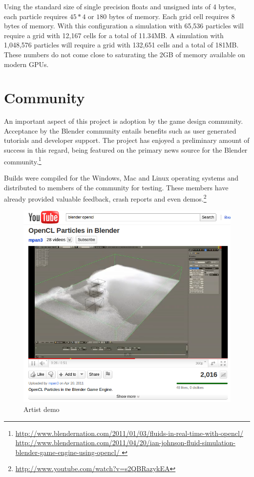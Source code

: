 Using the standard size of single precision floats and unsigned ints of 4
bytes, each particle requires $45*4$ or $180$ bytes of memory. Each grid cell
requires $8$ bytes of memory. With this configuration a simulation with 65,536
particles will require a grid with 12,167 cells for a total of 11.34MB. A
simulation with 1,048,576 particles will require a grid with 132,651 cells and a
total of 181MB. These numbers do not come close to saturating the 2GB of memory
available on modern GPUs.


\section{Community}
An important aspect of this project is adoption by the game design community.
Acceptance by the Blender community entails benefits such as user generated
tutorials and developer support. The project has enjoyed a preliminary amount
of success in this regard, being featured on the primary news source for
the Blender community.\footnote{
\url{http://www.blendernation.com/2011/01/03/fluids-in-real-time-with-opencl/}
\\ 
\url{
http://www.blendernation.com/2011/04/20/ian-johnson-fluid-simulation-blender-game-engine-using-opencl/
} }

Builds were compiled for the Windows, Mac and Linux operating systems and
distributed to members of the community for testing. These members have already
provided valuable feedback, crash reports and even demos.\footnote{ \url{http://www.youtube.com/watch?v=s2QBRazykEA}} 

\begin{figure}[!htc]
 		\centering
		\includegraphics[scale=0.5]{figures/youtube.png}
        \caption{ Artist demo }
		\label{fig:mpan}
\end{figure}

